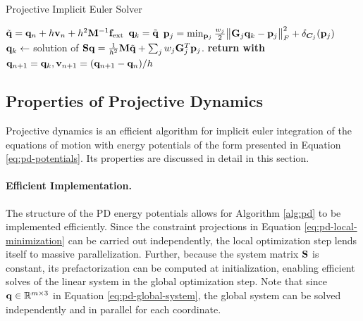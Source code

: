 \begin{algorithm}
\caption{Projective Implicit Euler Solver}\label{alg:pd}
\begin{algorithmic}
\State $\tilde{\mathbf{q}} = \mathbf{q}_n + h\mathbf{v}_n + h^2\mathbf{M}^{-1}\mathbf{f}_{\text{ext}}$
\State $\mathbf{q}_k = \tilde{\mathbf{q}}$
\State $\mathbf{p}_j = \min_{\mathbf{p}_j} \frac{w_j}{2}\norm{\mathbf{G}_j\mathbf{q}_k - \mathbf{p}_j}^2_F + \delta_{\bm{C}_j}(\mathbf{p}_j)$
\EndFor
\State $\mathbf{q}_{k} \gets$ solution of $\mathbf{S}\mathbf{q} = \frac{1}{h^2}\mathbf{M}\tilde{\mathbf{q}} + \sum_j w_j \mathbf{G}_j^T \mathbf{p}_j$.
\EndFor
\State \textbf{return with } $\mathbf{q}_{n+1} = \mathbf{q}_k, \mathbf{v}_{n+1} = (\mathbf{q}_{n+1} - \mathbf{q}_n) / h$
\EndProcedure
\end{algorithmic}
\end{algorithm}

\subsection{Properties of Projective Dynamics}\label{ss:pd-properties}
Projective dynamics is an efficient algorithm for implicit euler integration of the equations of motion with energy potentials of the form 
presented in Equation \ref{eq:pd-potentials}. Its properties are discussed in detail in this section.

\paragraph{Efficient Implementation.}
The structure of the PD energy potentials allows for Algorithm \ref{alg:pd} to be implemented efficiently. Since the constraint projections
in Equation \ref{eq:pd-local-minimization} can be carried out independently, the local optimization step lends itself to massive parallelization. 
Further, because the system matrix $\mathbf{S}$ is constant, its prefactorization can be computed at initialization, enabling
efficient solves of the linear system in the global optimization step. Note that since $\mathbf{q} \in \mathbb{R}^{m \times 3}$ in Equation \ref{eq:pd-global-system}, 
the global system can be solved independently and in parallel for each coordinate.

